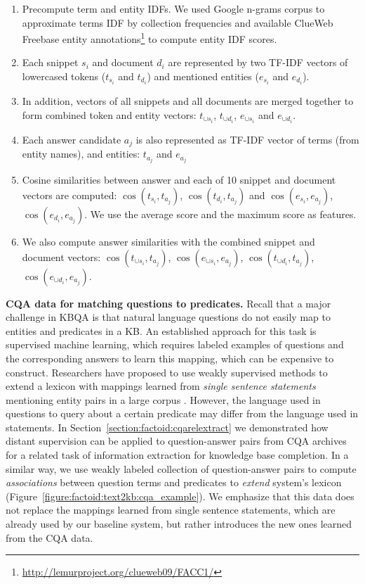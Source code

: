 \begin{enumerate}
\item Precompute term and entity IDFs. We used Google n-grams corpus to approximate terms IDF by collection frequencies and available ClueWeb Freebase entity annotations\footnote{\href{url}{http://lemurproject.org/clueweb09/FACC1/}} to compute entity IDF scores.
\item Each snippet $s_i$ and document $d_i$ are represented by two TF-IDF vectors of lowercased tokens ($t_{s_i}$ and $t_{d_i}$) and mentioned entities ($e_{s_i}$ and $e_{d_i}$).
\item In addition, vectors of all snippets and all documents are merged together to form combined token and entity vectors: $t_{\cup s_i}$, $t_{\cup d_i}$, $e_{\cup s_i}$ and $e_{\cup d_i}$.
\item Each answer candidate $a_j$ is also represented as TF-IDF vector of terms (from entity names), and entities: $t_{a_j}$ and $e_{a_j}$
\item Cosine similarities between answer and each of 10 snippet and document vectors are computed: $\cos(t_{s_i}, t_{a_j})$, $\cos(t_{d_i}, t_{a_j})$ and $\cos(e_{s_i}, e_{a_j})$, $\cos(e_{d_i}, e_{a_j})$.
We use the average score and the maximum score as features.
\item We also compute answer similarities with the combined snippet and document vectors: $\cos(t_{\cup s_i}, t_{a_j})$, $\cos(e_{\cup s_i}, e_{a_j})$, $\cos(t_{\cup d_i}, t_{a_j})$, $\cos(e_{\cup d_i}, e_{a_j})$.
\end{enumerate}

\textbf{CQA data for matching questions to predicates.}
Recall that a major challenge in KBQA is that natural language questions do not easily map to entities and predicates in a KB.
An established approach for this task is supervised machine learning, which requires labeled examples of questions and the corresponding answers to learn this mapping, which can be expensive to construct.
Researchers have proposed to use weakly supervised methods to extend a lexicon with mappings learned from \textit{single sentence statements} mentioning entity pairs in a large corpus \cite{YaoD14}.
However, the language used in questions to query about a certain predicate may differ from the language used in statements.
In Section~\ref{section:factoid:cqarelextract} we demonstrated how distant supervision can be applied to question-answer pairs from CQA archives for a related task of information extraction for knowledge base completion.
In a similar way, we use weakly labeled collection of question-answer pairs to compute {\em associations} between question terms and predicates to \textit{extend} system's lexicon (Figure~\ref{figure:factoid:text2kb:cqa_example}).
We emphasize that this data does not replace the mappings learned from single sentence statements, which are already used by our baseline system, but rather introduces the new ones learned from the CQA data.

